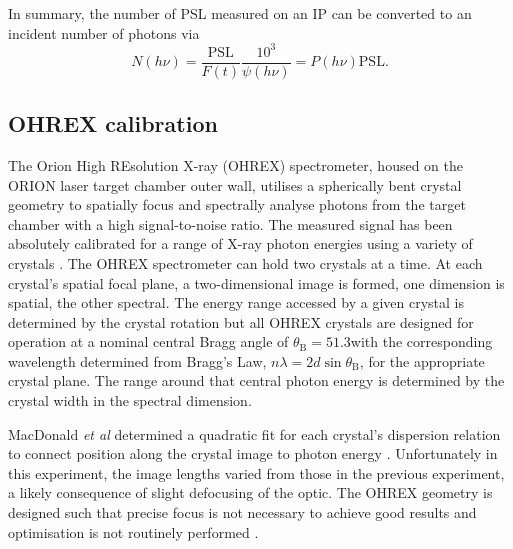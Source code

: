 In summary, the number of PSL measured on an IP can be converted to an incident number of photons via
\begin{equation}
	N(h\nu) = \frac{\mathrm{PSL}}{F(t)}\frac{10^3}{\psi(h\nu)} = P(h\nu) \mathrm{PSL}.
\end{equation}

\subsection{OHREX calibration}
The Orion High REsolution X-ray (OHREX) spectrometer, housed on the ORION laser target chamber outer wall, utilises a spherically bent crystal geometry to spatially focus and spectrally analyse photons from the target chamber \cite{beiersdorferLineshapeSpectroscopyVery2016} with a high signal-to-noise ratio. The measured signal has been absolutely calibrated for a range of X-ray photon energies using a variety of crystals \cite{macdonaldAbsoluteThroughputCalibration2021}. The OHREX spectrometer can hold two crystals at a time. At each crystal's spatial focal plane, a two-dimensional image is formed, one dimension is spatial, the other spectral. The energy range accessed by a given crystal is determined by the crystal rotation but all OHREX crystals are designed for operation at a nominal central Bragg angle of $\theta_\mathrm{B} = 51.3$\degree with the corresponding wavelength determined from Bragg's Law, $n\lambda = 2d\sin\theta_\mathrm{B}$, for the appropriate crystal plane. The range around that central photon energy is determined by the crystal width in the spectral dimension.

MacDonald \textit{et al} determined a quadratic fit for each crystal's dispersion relation to connect position along the crystal image to photon energy \cite{macdonaldAbsoluteThroughputCalibration2021}. Unfortunately in this experiment, the image lengths varied from those in the previous experiment, a likely consequence of slight defocusing of the optic. The OHREX geometry is designed such that precise focus is not necessary to achieve good results and optimisation is not routinely performed \cite{beiersdorferLineshapeSpectroscopyVery2016}.

